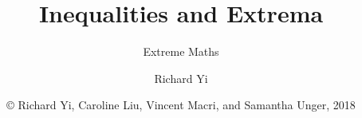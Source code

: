 
\title{Inequalities and Extrema}
\subtitle{Extreme Maths}
\author{Richard Yi}
\date{\copyright{} Richard Yi, Caroline Liu, Vincent Macri, and Samantha Unger, 2018}


	\frame{\titlepage}
	
	
	
	
	
	
	
  
